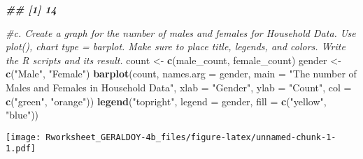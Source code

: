 \documentclass[
]{article}
\newenvironment{Shaded}{\begin{snugshade}}{\end{snugshade}}
\newcommand{\AttributeTok}[1]{\textcolor[rgb]{0.13,0.29,0.53}{#1}}
\newcommand{\CommentTok}[1]{\textcolor[rgb]{0.56,0.35,0.01}{\textit{#1}}}
\newcommand{\DocumentationTok}[1]{\textcolor[rgb]{0.56,0.35,0.01}{\textbf{\textit{#1}}}}
\newcommand{\FunctionTok}[1]{\textcolor[rgb]{0.13,0.29,0.53}{\textbf{#1}}}
\newcommand{\NormalTok}[1]{#1}
\newcommand{\OtherTok}[1]{\textcolor[rgb]{0.56,0.35,0.01}{#1}}
\newcommand{\StringTok}[1]{\textcolor[rgb]{0.31,0.60,0.02}{#1}}
\begin{document}
\begin{Shaded}
\begin{Highlighting}[]
\DocumentationTok{\#\# [1] 14}

\CommentTok{\#c. Create a graph for the number of males and females for Household Data. Use plot(), chart type = barplot. Make sure to place title, legends, and colors. Write the R scripts and its result.}
\NormalTok{count }\OtherTok{\textless{}{-}} \FunctionTok{c}\NormalTok{(male\_count, female\_count)}
\NormalTok{gender }\OtherTok{\textless{}{-}} \FunctionTok{c}\NormalTok{(}\StringTok{"Male"}\NormalTok{, }\StringTok{"Female"}\NormalTok{)}
\FunctionTok{barplot}\NormalTok{(count,}
\AttributeTok{names.arg =}\NormalTok{ gender,}
\AttributeTok{main =} \StringTok{"The number of Males and Females in Household Data"}\NormalTok{,}
\AttributeTok{xlab =} \StringTok{"Gender"}\NormalTok{,}
\AttributeTok{ylab =} \StringTok{"Count"}\NormalTok{,}
\AttributeTok{col =} \FunctionTok{c}\NormalTok{(}\StringTok{"green"}\NormalTok{, }\StringTok{"orange"}\NormalTok{))}
\FunctionTok{legend}\NormalTok{(}\StringTok{"topright"}\NormalTok{, }\AttributeTok{legend =}\NormalTok{ gender, }\AttributeTok{fill =} \FunctionTok{c}\NormalTok{(}\StringTok{"yellow"}\NormalTok{, }\StringTok{"blue"}\NormalTok{))}
\end{Highlighting}
\end{Shaded}

\texttt{[image: Rworksheet\_GERALDOY-4b\_files/figure-latex/unnamed-chunk-1-1.pdf]}
\end{document}

